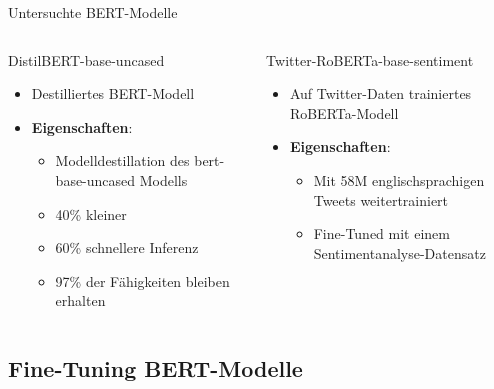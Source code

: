 \documentclass[aspectratio=169]{beamer} %
\begin{document}
\begin{frame}{Untersuchte BERT-Modelle}
\begin{columns}[T]
    \begin{block}{DistilBERT-base-uncased}
    \begin{itemize}
    \item Destilliertes BERT-Modell
    \item \textbf{Eigenschaften}:
      \begin{itemize}
      \item Modelldestillation des bert-base-uncased Modells
      \item 40\% kleiner
      \item 60\% schnellere Inferenz
      \item 97\% der Fähigkeiten bleiben erhalten
      \end{itemize}
    \end{itemize}
    \vspace{0.04cm}
    \end{block}
    \begin{block}{Twitter-RoBERTa-base-sentiment}
        \begin{itemize}
        \item Auf Twitter-Daten trainiertes RoBERTa-Modell
        \item \textbf{Eigenschaften}:
          \begin{itemize}
          \item Mit 58M englischsprachigen Tweets weitertrainiert
          \item Fine-Tuned mit einem Sentimentanalyse-Datensatz
          \end{itemize}
        \end{itemize}
        \vfill
    \end{block}
\end{columns}
\end{frame}

\subsection{Fine-Tuning BERT-Modelle}
\end{document}
